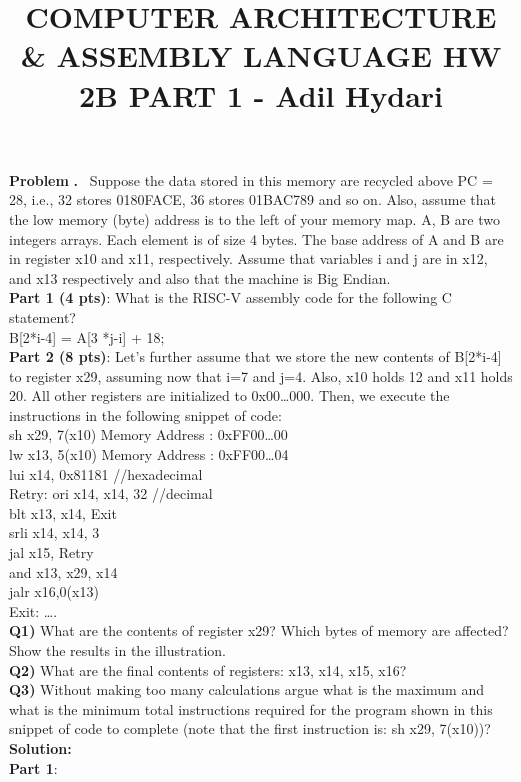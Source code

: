 \documentclass[11pt]{article}
\newcounter{problem}
\newcounter{solution}
\newcommand\Problem{%
	\stepcounter{problem}%
	\textbf{\theproblem.}~%
	\setcounter{solution}{0}%
}
\newcommand\TheSolution{%
	\textbf{Solution:}\\%
}
\begin{document}
\title{\textbf{COMPUTER ARCHITECTURE \& ASSEMBLY LANGUAGE HW 2B PART 1 - Adil Hydari}}
\maketitle
\textbf{Problem}
\Problem{Suppose the data stored in this memory are recycled above PC = 28, i.e., 32 stores 0180FACE, 36 stores 01BAC789 and so on. Also, assume that the low memory (byte) address is to the left of your memory map. A, B are two integers arrays. Each element is of size 4 bytes. The base address of A and B are in register x10 and x11, respectively. Assume that variables i and j are in x12, and x13 respectively and also that the machine is Big Endian.\\
	\textbf{Part 1 (4 pts)}: What is the RISC-V assembly code for the following C statement?\\
	B[2*i-4] = A[3 *j-i] + 18;\\
	\textbf{Part 2 (8 pts)}: Let’s further assume that we store the new contents of B[2*i-4] to register x29, assuming now that i=7 and j=4. Also, x10 holds 12 and x11 holds 20. All other registers are initialized to 0x00…000. Then, we execute the instructions in the following snippet of code:\\
	sh x29, 7(x10) Memory Address : 0xFF00…00\\
	lw x13, 5(x10) Memory Address : 0xFF00…04\\
	lui x14, 0x81181 //hexadecimal\\
	Retry: ori x14, x14, 32 //decimal\\
	blt x13, x14, Exit\\
	srli x14, x14, 3\\
	jal x15, Retry\\
	and x13, x29, x14\\
	jalr x16,0(x13)\\
	Exit: ….\\
	\textbf{Q1)} What are the contents of register x29? Which bytes of memory are affected? Show the results in the illustration.\\
	\textbf{Q2)} What are the final contents of registers: x13, x14, x15, x16?\\
	\textbf{Q3)} Without making too many calculations argue what is the maximum and what is the minimum total instructions required for the program shown in this snippet of code to complete (note that the first instruction is: sh x29, 7(x10))?}\\
	\TheSolution 
	\textbf{Part 1}: \\
\end{document}
